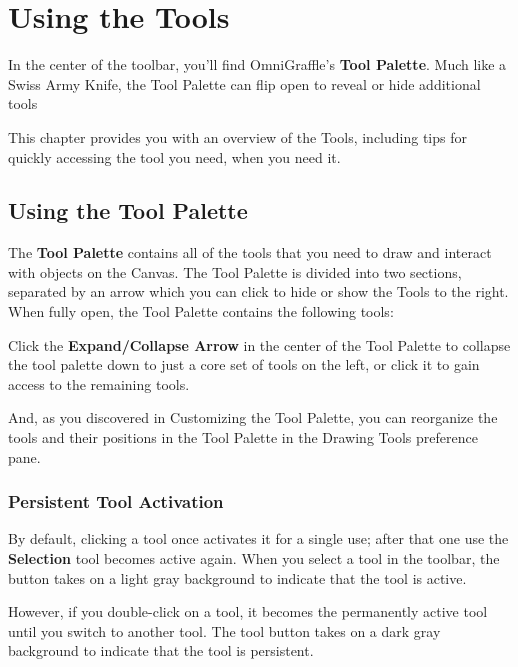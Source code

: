 \documentclass[../main.tex]{subfiles}
\begin{document}
\chapter{Using the Tools}

In the center of the toolbar, you'll find OmniGraffle's \textbf{Tool Palette}. Much like a Swiss
Army Knife, the Tool Palette can flip open to reveal or hide additional tools

This chapter provides you with an overview of the Tools, including tips for quickly accessing
the tool you need, when you need it.

\section{Using the Tool Palette}

The \textbf{Tool Palette} contains all of the tools that you need to draw and interact with
objects on the Canvas. The Tool Palette is divided into two sections, separated by an arrow
which you can click to hide or show the Tools to the right. When fully open, the Tool Palette
contains the following tools:


Click the \textbf{Expand/Collapse Arrow} in the center of the Tool Palette to collapse the tool
palette down to just a core set of tools on the left, or click it to gain access to the
remaining tools.


And, as you discovered in Customizing the Tool Palette, you can reorganize the tools and their
positions in the Tool Palette in the Drawing Tools preference pane.

\subsection{Persistent Tool Activation}

By default, clicking a tool once activates it for a single use; after that one use the
\textbf{Selection} tool becomes active again. When you select a tool in the toolbar, the
button takes on a light gray background to indicate that the tool is active.


However, if you double-click on a tool, it becomes the permanently active tool until you switch
to another tool. The tool button takes on a dark gray background to indicate that the tool is
persistent.
\end{document}
